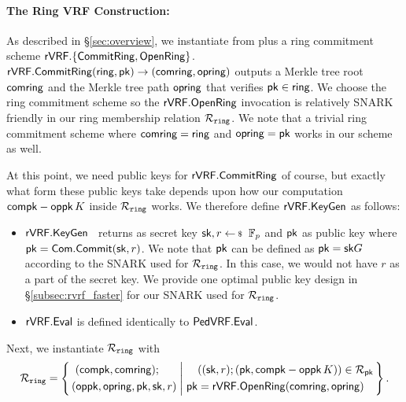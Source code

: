 \paragraph{The Ring VRF Construction:}
As described in \S\ref{sec:overview},
we instantiate \rVRF from \PedVRF plus a ring commitment scheme
 ${\mathsf{rVRF}}.\{ {\mathsf{CommitRing}}, {\mathsf{OpenRing}} \}$. $ {\mathsf{rVRF}}.{\mathsf{CommitRing}}(\mathsf{ring},\mathsf{pk}) \rightarrow (\mathsf{comring},\mathsf{opring})$  outputs a Merkle tree root $\mathsf{comring}  $ and the Merkle tree path $ \mathsf{opring} $ that verifies $ \mathsf{pk} \in \mathsf{ring} $.
We choose the ring commitment scheme so the ${\mathsf{rVRF}}.{\mathsf{OpenRing}}$ invocation
is relatively SNARK friendly in our ring membership relation $ \mathcal{R}_{\mathtt{ring}} $. We note that a trivial ring commitment scheme where $ \mathsf{comring} = \mathsf{ring} $ and $ \mathsf{opring} = \mathsf{pk} $ works in our scheme as well.

At this point, we need public keys for ${\mathsf{rVRF}}.{\mathsf{CommitRing}}$ of course,
but exactly what form these public keys take depends upon how our computation
 $\mathsf{compk} - \mathsf{oppk} \, K$ inside $\mathcal{R}_{\mathtt{ring}}$ works.
We therefore define $ {\mathsf{rVRF}}.{\mathsf{KeyGen}} $ as follows:

\begin{itemize}
	\item ${\mathsf{rVRF}}.{\mathsf{KeyGen}}$ \, returns as secret key $\sk,r \leftsample \F_p$ and $ \mathsf{pk} $ as public key where $ \mathsf{pk} = \mathsf{Com}.\mathsf{Commit}(\mathsf{sk},r)  $. We note that $ \mathsf{pk}  $ can be defined as $ \mathsf{pk} = \mathsf{sk} G $ according to the SNARK used for $ \mathcal{R}_{\mathtt{ring}} $. In this case, we would not have $ r $ as a part of the secret key. We provide one optimal public key design in \S\ref{subsec:rvrf_faster} for our SNARK used for $ \mathcal{R}_{\mathtt{ring}} $. 
\end{itemize}

 

 


\begin{itemize}
\item ${\mathsf{rVRF}}.{\mathsf{Eval}}$ is defined identically to ${\mathsf{PedVRF}}.{\mathsf{Eval}}$.
\end{itemize}
Next, we instantiate  $ \mathcal{R}_{\mathtt{ring}} $ with
$$ \Rring = \Setst{ 
	\begin{aligned}
		& \,\, (\compk,\comring); \\ 
		& (\openpk, \openring, \pk, \sk, r) 
	\end{aligned}
}{
	\begin{aligned}
		 &((\sk, r);(\pk, \compk - \openpk \, \genB)) \in \rel_{\pk} \\
		\pk &= \rVRF.\OpenRing(\comring,\openring)
	\end{aligned}
} \mathperiod $$

